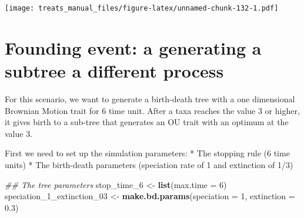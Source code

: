 \documentclass[
]{book}
\newenvironment{Shaded}{\begin{snugshade}}{\end{snugshade}}
\newcommand{\CommentTok}[1]{\textcolor[rgb]{0.56,0.35,0.01}{\textit{#1}}}
\newcommand{\DataTypeTok}[1]{\textcolor[rgb]{0.13,0.29,0.53}{#1}}
\newcommand{\DecValTok}[1]{\textcolor[rgb]{0.00,0.00,0.81}{#1}}
\newcommand{\FloatTok}[1]{\textcolor[rgb]{0.00,0.00,0.81}{#1}}
\newcommand{\KeywordTok}[1]{\textcolor[rgb]{0.13,0.29,0.53}{\textbf{#1}}}
\newcommand{\NormalTok}[1]{#1}
\newcommand{\OperatorTok}[1]{\textcolor[rgb]{0.81,0.36,0.00}{\textbf{#1}}}
\newcommand{\OtherTok}[1]{\textcolor[rgb]{0.56,0.35,0.01}{#1}}
\newcommand{\StringTok}[1]{\textcolor[rgb]{0.31,0.60,0.02}{#1}}
\begin{document}
\begin{Shaded}
\end{Shaded}

\texttt{[image: treats\_manual\_files/figure-latex/unnamed-chunk-132-1.pdf]}

\hypertarget{EG_founding_traits}{%
\section{Founding event: a generating a subtree a different process}\label{EG_founding_traits}}

For this scenario, we want to generate a birth-death tree with a one dimensional Brownian Motion trait for 6 time unit.
After a taxa reaches the value 3 or higher, it gives birth to a sub-tree that generates an OU trait with an optimum at the value 3.

First we need to set up the simulation parameters:
* The stopping rule (6 time units)
* The birth-death parameters (speciation rate of 1 and extinction of 1/3)

\begin{Shaded}
\begin{Highlighting}[]
\CommentTok{\#\# The tree parameters}
\NormalTok{stop\_time\_}\DecValTok{6}\NormalTok{ \textless{}{-}}\StringTok{ }\KeywordTok{list}\NormalTok{(}\DataTypeTok{max.time =} \DecValTok{6}\NormalTok{)}
\NormalTok{speciation\_}\DecValTok{1}\NormalTok{\_extinction\_}\DecValTok{03}\NormalTok{ \textless{}{-}}\StringTok{ }\KeywordTok{make.bd.params}\NormalTok{(}\DataTypeTok{speciation =} \DecValTok{1}\NormalTok{,}
                                             \DataTypeTok{extinction =} \FloatTok{0.3}\NormalTok{)}
\end{Highlighting}
\end{Shaded}
\end{document}
